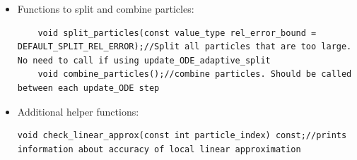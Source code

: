 \documentclass[10pt]{article} %
\begin{document}
\begin{itemize}
\begin{itemize}
\begin{lstlisting}
\end{lstlisting}
\item
Functions to split and combine particles: 
\begin{lstlisting}
    void split_particles(const value_type rel_error_bound = DEFAULT_SPLIT_REL_ERROR);//Split all particles that are too large. No need to call if using update_ODE_adaptive_split
    void combine_particles();//combine particles. Should be called between each update_ODE step
\end{lstlisting}
\item
Additional helper functions:
\begin{lstlisting}
void check_linear_approx(const int particle_index) const;//prints information about accuracy of local linear approximation
\end{lstlisting}

\end{itemize}

\end{itemize}
\end{document}
